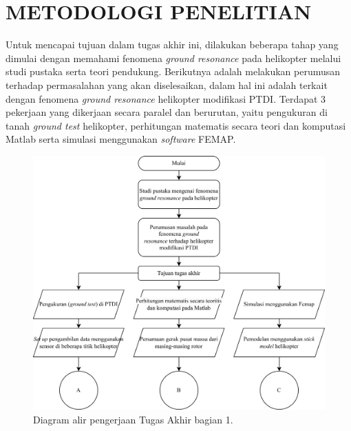 \chapter{METODOLOGI PENELITIAN}
\label{chap:metodologipenelitian}


Untuk mencapai tujuan dalam tugas akhir ini, dilakukan beberapa tahap yang dimulai dengan memahami fenomena \textit{ground resonance} pada helikopter melalui studi pustaka serta teori pendukung. Berikutnya adalah melakukan perumusan terhadap permasalahan yang akan diselesaikan, dalam hal ini adalah terkait dengan fenomena \textit{ground resonance} helikopter modifikasi PTDI. Terdapat 3 pekerjaan yang dikerjaan secara paralel dan berurutan, yaitu pengukuran di tanah \textit{ground test} helikopter, perhitungan matematis secara teori dan komputasi Matlab serta simulasi menggunakan \textit{software} FEMAP. 

\begin{figure}[H]
	\centering
	\includegraphics[width=1\linewidth]{gambar/TA_flow-Page-1.jpg}
	\caption{Diagram alir pengerjaan Tugas Akhir bagian 1.}
	\label{fig:TA_flow-Page-1.jpg}
\end{figure}

